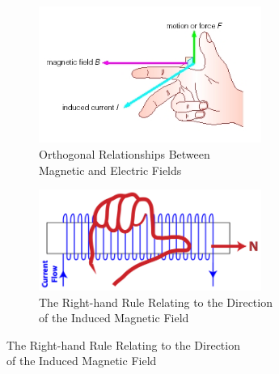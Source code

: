        \begin{figure}[ht]
            \centering

            \begin{subfigure}[b]{0.5\linewidth}
                \includegraphics[width=0.8\textwidth]{figures/right_hand.jpg}
                \caption{Orthogonal Relationships Between \\Magnetic and Electric Fields}
            \end{subfigure}\hfill
            \begin{subfigure}[b]{0.5\linewidth}
                \centering
                \includegraphics[width=0.8\textwidth]{figures/right_hand_coil.png} %
                \caption{The Right-hand Rule Relating to the Direction \\of the Induced Magnetic Field}
            \end{subfigure}


\end{figure}
